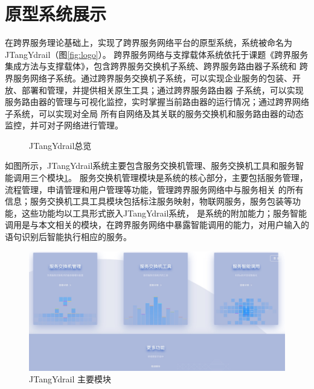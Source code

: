 \section{原型系统展示}
在跨界服务理论基础上，实现了跨界服务网络平台的原型系统，系统被命名为JTangYdrail（图\ref{fig:logo}）。
跨界服务网络与支撑载体系统依托于课题《跨界服务集成方法与支撑载体》，包含跨界服务交换机子系统、跨界服务路由器子系统和
跨界服务网络子系统。通过跨界服务交换机子系统，可以实现企业服务的包装、开放、部署和管理，并提供相关原生工具；通过跨界服务路由器
子系统，可以实现服务路由器的管理与可视化监控，实时掌握当前路由器的运行情况；通过跨界网络子系统，可以实现对全局
所有自网络及其关联的服务交换机和服务路由器的动态监控，并可对子网络进行管理。

\begin{figure}[htbp]
  \caption{JTangYdrail总览}
  \end{figure}
  如图所示，JTangYdrail系统主要包含服务交换机管理、服务交换机工具和服务智能调用三个模块\ref{fig:sangemokuai}。
  服务交换机管理模块是系统的核心部分，主要包括服务管理，流程管理，申请管理和用户管理等功能，管理跨界服务网络中与服务相关
  的所有信息；服务交换机工具工具模块包括标注服务映射，物联网服务，服务包装等功能，这些功能均以工具形式嵌入JTangYdrail系统，
  是系统的附加能力；服务智能调用是与本文相关的模块，在跨界服务网络中暴露智能调用的能力，对用户输入的语句识别后智能执行相应的服务。

  \begin{figure}[htbp]
    \centering
    \includegraphics[width=17cm]{./images/sangemokuai.png}
    \caption{JTangYdrail 主要模块}
    \label{fig:sangemokuai}
  \end{figure}

